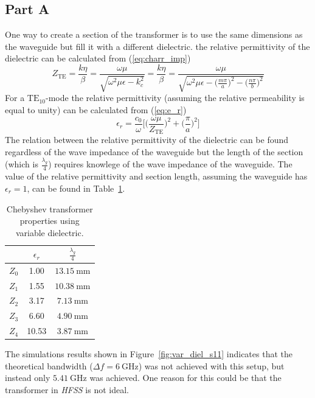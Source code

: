 \documentclass[12pt,a4paper]{article}
\begin{document}
\subsection{Part A}\label{sec:1a}
One way to create a section of the transformer is to use the same dimensions as the waveguide but fill it with a different dielectric. the relative permittivity of the dielectric can be calculated from (\ref{eq:charr_imp})
\begin{equation}
  Z_\text{TE}=\frac{k\eta}{\beta}=\frac{\omega\mu}{\sqrt{\omega^2\mu\epsilon-k^2_c}}=\frac{k\eta}{\beta}=\frac{\omega\mu}{\sqrt{\omega^2\mu\epsilon-\big(\frac{m\pi}{a}\big)^2-\big(\frac{n\pi}{b}\big)^2}}
  \label{eq:charr_imp}
\end{equation}
For a $\text{TE}_{{10}}$-mode the relative permittivity (assuming the relative permeability is equal to unity) can be calculated from (\ref{eq:e_r})
\begin{equation}
  \epsilon_r=\frac{c_0}{\omega}\Big[\Big(\frac{\omega\mu}{Z_\text{TE}}\Big)^2+\Big(\frac{\pi}{a}\Big)^2\Big]
  \label{eq:e_r}
\end{equation}
The relation between the relative permittivity of the dielectric can be found regardless of the wave impedance of the waveguide but the length of the section (which is $\frac{\lambda_g}{4}$) requires knowlege of the wave impedance of the waveguide. The value of the relative permittivity and section length, assuming the waveguide has $\epsilon_r=1$, can be found in Table~\ref{tab:e_r}.
\begin{table}
  \centering
  \caption{Chebyshev transformer properties using variable dielectric.}
  \begin{tabular}{|c|c|c|}\hline
     & $\epsilon_r$ & $\frac{\lambda_g}{4}$ \\ \hline
    $Z_0$ & 1.00 & $\SI{13.15}{\milli\metre}$ \\ \hline
    $Z_1$ & 1.55 & $\SI{10.38}{\milli\metre}$ \\ \hline
    $Z_2$ & 3.17 & $\SI{7.13}{\milli\metre}$ \\ \hline
    $Z_3$ & 6.60 & $\SI{4.90}{\milli\metre}$ \\ \hline
    $Z_4$ & 10.53 & $\SI{3.87}{\milli\metre}$ \\ \hline
  \end{tabular}
  \label{tab:e_r}
\end{table}

The simulations results shown in Figure~\ref{fig:var_diel_s11} indicates that the theoretical bandwidth ($\Delta f=\SI{6}{\giga\hertz}$) was not achieved with this setup, but instead only $\SI{5.41}{\giga\hertz}$ was achieved. One reason for this could be that the transformer in \textit{HFSS} is not ideal.
\end{document}
